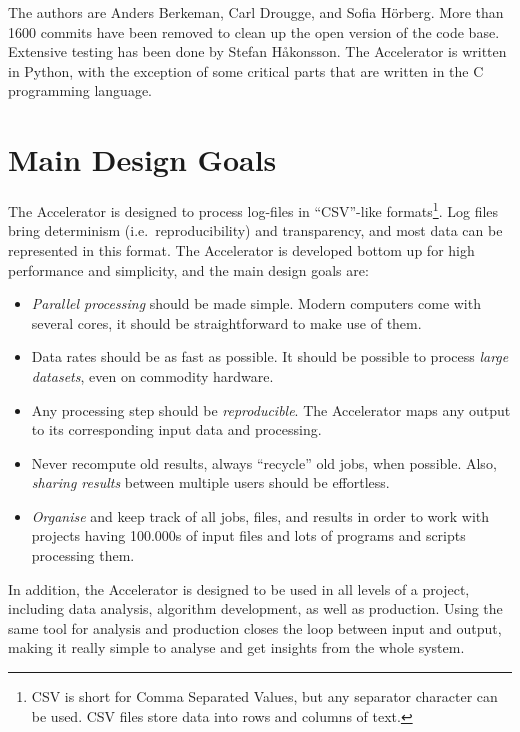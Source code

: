 The authors are Anders Berkeman, Carl Drougge, and Sofia H\"orberg.
More than 1600 commits have been removed to clean up the open version
of the code base.  Extensive testing has been done by Stefan
H{\aa}konsson.  The Accelerator is written in Python, with the
exception of some critical parts that are written in the C programming
language.



\section{Main Design Goals}
The Accelerator is designed to process log-files in ``CSV''-like
formats\footnote{CSV is short for Comma Separated Values, but any
separator character can be used.  CSV files store data into rows and
columns of text.}.  Log files bring determinism (i.e.\
reproducibility) and transparency, and most data can be represented in
this format.  The Accelerator is developed bottom up for high
performance and simplicity, and the main design goals are:
\begin{itemize}

\item[] \textsl{Parallel processing} should be made simple.  Modern computers
  come with several cores, it should be straightforward to make use of
  them.

\item[] Data rates should be as fast as possible.  It should be
  possible to process \textsl{large datasets}, even on commodity hardware.

\item[] Any processing step should be \textsl{reproducible}.
The Accelerator maps any output to its corresponding input data and
processing.

\item[] Never recompute old results, always ``recycle'' old jobs, when
  possible.  Also, \textsl{sharing results} between multiple users should be
  effortless.

\item[] \textsl{Organise} and keep track of all jobs, files, and results in
  order to work with projects having 100.000s of input files and lots
  of programs and scripts processing them.
  
\end{itemize}
In addition, the Accelerator is designed to be used in all levels of a
project, including data analysis, algorithm development, as well as
production.  Using the same tool for analysis and production closes
the loop between input and output, making it really simple to analyse
and get insights from the whole system.



